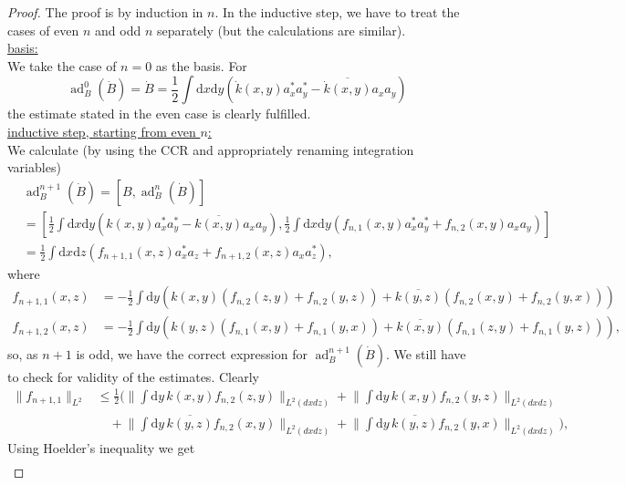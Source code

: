 \documentclass[11pt,a4paper,draft,DIV11]{scrartcl}	%
\newcommand{\ad}{\operatorname{ad}}	%
\newcommand{\di}{\textrm{d}}		%
\newcommand{\cc}[1]{\overline{#1}}	%
\newcommand{\norm}[1]{\lVert#1\rVert}	%
\newcommand{\be}[1]{\begin{equation}\label{eq:#1}}	%
\newcommand{\ee}{\end{equation}}
\newcommand{\bd}{\begin{displaymath}}			%
\newcommand{\ed}{\end{displaymath}}
\begin{document}
\begin{proof} The proof is by induction in $n$. In the inductive step, we have to treat the cases of even $n$ and odd $n$ separately (but the calculations are similar).\\
\underline{basis:}\\
We take the case of $n=0$ as the basis. For
\bd
\ad^0_B(\dot B) = \dot B = \frac{1}{2}\int \di x\di y\left( \dot k(x,y) a^\ast_x a^\ast_y - \cc{\dot k(x,y)} a_x a_y \right)
\ed
the estimate stated in the even case is clearly fulfilled.\\
\underline{inductive step, starting from even $n$:}\\
We calculate (by using the CCR and appropriately renaming integration variables)
\begin{align*}
& \ad^{n+1}_B(\dot B) = [B,\ad^n_B(\dot B)] \\
& = \left[\frac{1}{2} \int \di x\di y\left( k(x,y)a^\ast_x a^\ast_y - \cc{k(x,y)}a_x a_y \right), \frac{1}{2}\int \di x\di y\left( f_{n,1}(x,y) a^\ast_x a^\ast_y + f_{n,2}(x,y) a_x a_y \right)\right] \\
& = \frac{1}{2} \int \di x\di z \left(f_{n+1,1}(x,z) a^\ast_x a_z + f_{n+1,2}(x,z) a_x a^\ast_z \right),
\end{align*}
where
\begin{equation}
\label{eq:even}
\begin{split}
f_{n+1,1}(x,z) & = -\frac{1}{2} \int \di y \left( k(x,y) \left( f_{n,2}(z,y) + f_{n,2}(y,z) \right) + \cc{k(y,z)}\left( f_{n,2}(x,y) + f_{n,2}(y,x)\right) \right)\\
f_{n+1,2}(x,z) & = -\frac{1}{2} \int \di y \left( k(y,z) \left( f_{n,1}(x,y) + f_{n,1}(y,x) \right) + \cc{k(x,y)}\left( f_{n,1}(z,y) + f_{n,1}(y,z)\right) \right), 
\end{split}
\end{equation}
so, as $n+1$ is odd, we have the correct expression for $\ad^{n+1}_B(\dot B)$. We still have to check for validity of the estimates.
Clearly
\be{normnorm}
\begin{split}
\norm{f_{n+1,1}}_{L^2} & \leq \frac{1}{2} \bigg( \norm{\int \di y\, k(x,y) f_{n,2}(z,y)}_{L^2(dxdz)} + \norm{\int \di y\, k(x,y) f_{n,2}(y,z)}_{L^2(dxdz)} \\
& \quad + \norm{\int \di y\, \cc{k(y,z)}f_{n,2}(x,y)}_{L^2(dxdz)} + \norm{\int \di y\, \cc{k(y,z)} f_{n,2}(y,x)}_{L^2(dxdz)} \bigg),
\end{split}
\ee
Using Hoelder's inequality we get
\begin{align*}

\end{align*}
\end{proof}
\end{document}
